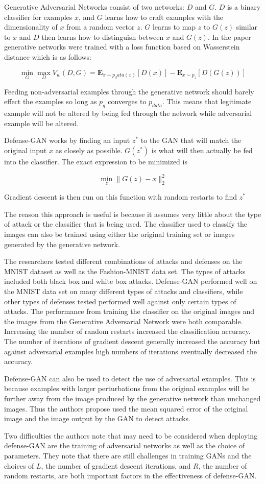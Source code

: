 \documentclass[../article.tex]{subfiles}
\begin{document}
Generative Adversarial Networks consist of two networks: $D$ and $G$. $D$ is a binary classifier for examples $x$, and $G$ learns how to craft examples with the dimensionality of $x$ from a random vector $z$. $G$ learns to map $z$ to $G(z)$ similar to $x$ and $D$ then learns how to distinguish between $x$ and $G(z)$. In the paper generative networks were trained with a loss function based on Wasserstein distance which is as follows:

\[ \min_G \max_D V_w(D, G) = \mathbf{E}_{x \sim p_data(x)}[D(x)] -  \mathbf{E}_{x \sim p_z}[D(G(z))]\]

Feeding non-adversarial examples through the generative network should barely effect the examples so long as $p_g$ converges to $p_{data}$. This means that legitimate example will not be altered by being fed through the network while adversarial example will be altered.

Defense-GAN works by finding an input $z^*$ to the GAN that will match the original input $x$ as closely as possible. $G(z^*)$ is what will then actually be fed into the classifier. The exact expression to be minimized is

\[ \min_z \|G(z) - x\|^2_2\]

Gradient descent is then run on this function with random restarts to find $z^*$

The reason this approach is useful is because it assumes very little about the type of attack or the classifier that is being used. The classifier used to classify the images can also be trained using either the original training set or images generated by the generative network.

The researchers tested different combinations of attacks and defenses on the MNIST dataset as well as the Fashion-MNIST data set. The types of attacks included both black box and white box attacks. Defense-GAN performed well on the MNIST data set on many different types of attacks and classifiers, while other types of defenses tested performed well against only certain types of attacks. The performance from training the classifier on the original images and the images from the Generative Adversarial Network were both comparable. Increasing the number of random restarts increased the classification accuracy. The number of iterations of gradient descent generally increased the accuracy but against adversarial examples high numbers of iterations eventually decreased the accuracy.

Defense-GAN can also be used to detect the use of adversarial examples. This is because examples with larger perturbations from the original examples will be further away from the image produced by the generative network than unchanged images. Thus the authors propose used the mean squared error of the original image and the image output by the GAN to detect attacks.

Two difficulties the authors note that may need to be considered when deploying defense-GAN are the training of adversarial networks as well as the choice of parameters. They note that there are still challenges in training GANs and the choices of $L$, the number of gradient descent iterations, and $R$, the number of random restarts, are both important factors in the effectiveness of defense-GAN.
\end{document}
